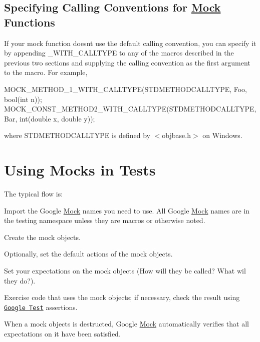 \subsection*{Specifying Calling Conventions for \hyperlink{class_mock}{Mock} Functions}

If your mock function doesn\textquotesingle{}t use the default calling convention, you can specify it by appending {\ttfamily \+\_\+\+W\+I\+T\+H\+\_\+\+C\+A\+L\+L\+T\+Y\+PE} to any of the macros described in the previous two sections and supplying the calling convention as the first argument to the macro. For example, 
\begin{DoxyCode}
MOCK\_METHOD\_1\_WITH\_CALLTYPE(STDMETHODCALLTYPE, Foo, bool(int n));
MOCK\_CONST\_METHOD2\_WITH\_CALLTYPE(STDMETHODCALLTYPE, Bar, int(double x, double y));
\end{DoxyCode}
 where {\ttfamily S\+T\+D\+M\+E\+T\+H\+O\+D\+C\+A\+L\+L\+T\+Y\+PE} is defined by {\ttfamily $<$objbase.\+h$>$} on Windows.

\section*{Using Mocks in Tests}

The typical flow is\+:
\begin{DoxyEnumerate}
\item Import the Google \hyperlink{class_mock}{Mock} names you need to use. All Google \hyperlink{class_mock}{Mock} names are in the {\ttfamily testing} namespace unless they are macros or otherwise noted.
\end{DoxyEnumerate}
\begin{DoxyEnumerate}
\item Create the mock objects.
\end{DoxyEnumerate}
\begin{DoxyEnumerate}
\item Optionally, set the default actions of the mock objects.
\end{DoxyEnumerate}
\begin{DoxyEnumerate}
\item Set your expectations on the mock objects (How will they be called? What wil they do?).
\end{DoxyEnumerate}
\begin{DoxyEnumerate}
\item Exercise code that uses the mock objects; if necessary, check the result using \href{http://code.google.com/p/googletest/}{\tt Google Test} assertions.
\end{DoxyEnumerate}
\begin{DoxyEnumerate}
\item When a mock objects is destructed, Google \hyperlink{class_mock}{Mock} automatically verifies that all expectations on it have been satisfied.
\end{DoxyEnumerate}

